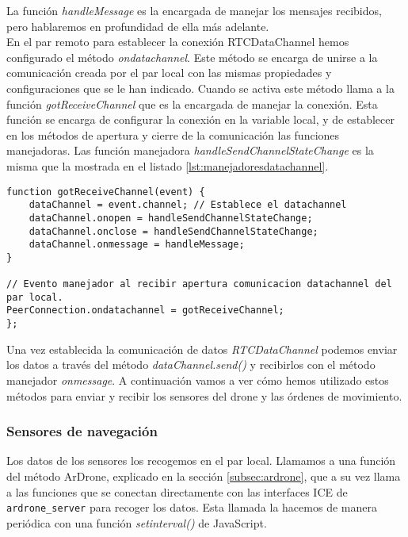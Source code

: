 La función \emph{handleMessage} es la encargada de manejar los mensajes recibidos, pero hablaremos en profundidad de ella más adelante.\\

En el par remoto para establecer la conexión RTCDataChannel hemos configurado el método \emph{ondatachannel}. Este método se encarga de unirse a la comunicación creada por el par local con las mismas propiedades y configuraciones que se le han indicado. Cuando se activa este método llama a la función \emph{gotReceiveChannel} que es la encargada de manejar  la conexión. Esta función se encarga de configurar la conexión en la variable local, y de establecer en los métodos de apertura y cierre de la comunicación las funciones manejadoras. Las función manejadora \emph{handleSendChannelStateChange} es la misma que la mostrada en el listado \ref{lst:manejadoresdatachannel}.\\

\begin{lstlisting}[caption={Establecimiento de RTCDataChannel en el par remoto.}]
function gotReceiveChannel(event) {
	dataChannel = event.channel; // Establece el datachannel
	dataChannel.onopen = handleSendChannelStateChange;
	dataChannel.onclose = handleSendChannelStateChange;
	dataChannel.onmessage = handleMessage;
}

// Evento manejador al recibir apertura comunicacion datachannel del par local.
PeerConnection.ondatachannel = gotReceiveChannel;
};\end{lstlisting}

Una vez establecida la comunicación de datos \emph{RTCDataChannel} podemos enviar los datos a través del método \emph{dataChannel.send()} y recibirlos con el método manejador \emph{onmessage}. A continuación vamos a ver cómo hemos utilizado estos métodos para enviar y recibir los sensores del drone y las órdenes de movimiento.\\


\subsubsection{Sensores de navegación}

Los datos de los sensores los recogemos en el par local. Llamamos a una función del método ArDrone, explicado en la sección \ref{subsec:ardrone}, que a su vez llama a las funciones que se conectan directamente con las interfaces ICE de \texttt{ardrone\_server} para recoger los datos. Esta llamada la hacemos de manera periódica con una función \emph{setinterval()} de JavaScript.\\

